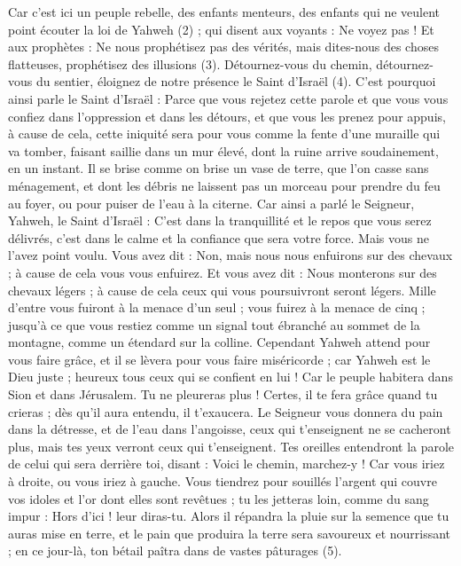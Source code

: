 \begin{multicols}{2}
{Car c'est ici un peuple rebelle, des enfants menteurs, des enfants qui ne veulent point écouter la loi de Yahweh (2) ;
qui disent aux voyants : Ne voyez pas ! Et aux prophètes : Ne nous prophétisez pas des vérités, mais dites-nous des choses flatteuses, prophétisez des illusions (3).
Détournez-vous du chemin, détournez-vous du sentier, éloignez de notre présence le Saint d'Israël (4).
C'est pourquoi ainsi parle le Saint d'Israël : Parce que vous rejetez cette parole et que vous vous confiez dans l'oppression et dans les détours, et que vous les prenez pour appuis,
à cause de cela, cette iniquité sera pour vous comme la fente d'une muraille qui va tomber, faisant saillie dans un mur élevé, dont la ruine arrive soudainement, en un instant.
Il se brise comme on brise un vase de terre, que l’on casse sans ménagement, et dont les débris ne laissent pas un morceau pour prendre du feu au foyer, ou pour puiser de l’eau à la citerne.
Car ainsi a parlé le Seigneur, Yahweh, le Saint d'Israël : C’est dans la tranquillité et le repos que vous serez délivrés, c’est dans le calme et la confiance que sera votre force. Mais vous ne l'avez point voulu.
Vous avez dit : Non, mais nous nous enfuirons sur des chevaux ; à cause de cela vous vous enfuirez. Et vous avez dit : Nous monterons sur des chevaux légers ; à cause de cela ceux qui vous poursuivront seront légers.
Mille d'entre vous fuiront à la menace d'un seul ; vous fuirez à la menace de cinq ; jusqu'à ce que vous restiez comme un signal tout ébranché au sommet de la montagne, comme un étendard sur la colline.
Cependant Yahweh attend pour vous faire grâce, et il se lèvera pour vous faire miséricorde ; car Yahweh est le Dieu juste ; heureux tous ceux qui se confient en lui !
Car le peuple habitera dans Sion et dans Jérusalem. Tu ne pleureras plus ! Certes, il te fera grâce quand tu crieras ; dès qu’il aura entendu, il t'exaucera.
Le Seigneur vous donnera du pain dans la détresse, et de l'eau dans l’angoisse, ceux qui t’enseignent ne se cacheront plus, mais tes yeux verront ceux qui t’enseignent.
Tes oreilles entendront la parole de celui qui sera derrière toi, disant : Voici le chemin, marchez-y ! Car vous iriez à droite, ou vous iriez à gauche.
Vous tiendrez pour souillés l’argent qui couvre vos idoles et l’or dont elles sont revêtues ; tu les jetteras loin, comme du sang impur : Hors d’ici ! leur diras-tu.
Alors il répandra la pluie sur la semence que tu auras mise en terre, et le pain que produira la terre sera savoureux et nourrissant ; en ce jour-là, ton bétail paîtra dans de vastes pâturages (5).
}
\end{multicols}
